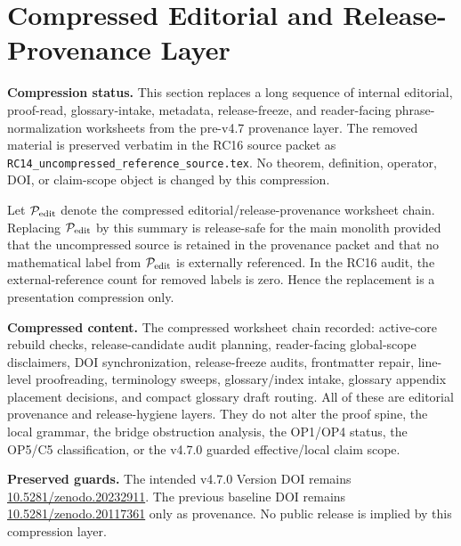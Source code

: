 
\clearpage
\section{Compressed Editorial and Release-Provenance Layer}
\label{sec:rc16-compressed-editorial-release-provenance}

\noindent\textbf{Compression status.}
This section replaces a long sequence of internal editorial, proof-read, glossary-intake,
metadata, release-freeze, and reader-facing phrase-normalization worksheets from the
pre-v4.7 provenance layer.  The removed material is preserved verbatim in the RC16 source
packet as \texttt{RC14\_uncompressed\_reference\_source.tex}.  No theorem, definition,
operator, DOI, or claim-scope object is changed by this compression.

\begin{theoremlet}
Let \(\mathcal P_{\rm edit}\) denote the compressed editorial/release-provenance worksheet
chain.  Replacing \(\mathcal P_{\rm edit}\) by this summary is release-safe for the main
monolith provided that the uncompressed source is retained in the provenance packet and
that no mathematical label from \(\mathcal P_{\rm edit}\) is externally referenced.  In the
RC16 audit, the external-reference count for removed labels is zero.  Hence the replacement
is a presentation compression only.
\end{theoremlet}

\noindent\textbf{Compressed content.}
The compressed worksheet chain recorded: active-core rebuild checks, release-candidate
audit planning, reader-facing global-scope disclaimers, DOI synchronization, release-freeze
audits, frontmatter repair, line-level proofreading, terminology sweeps, glossary/index
intake, glossary appendix placement decisions, and compact glossary draft routing.  All of
these are editorial provenance and release-hygiene layers.  They do not alter the proof
spine, the local grammar, the bridge obstruction analysis, the OP1/OP4 status, the OP5/C5
classification, or the v4.7.0 guarded effective/local claim scope.

\noindent\textbf{Preserved guards.}
The intended v4.7.0 Version DOI remains
\href{https://doi.org/10.5281/zenodo.20232911}{10.5281/zenodo.20232911}.  The previous
baseline DOI remains \href{https://doi.org/10.5281/zenodo.20117361}{10.5281/zenodo.20117361}
only as provenance.  No public release is implied by this compression layer.

